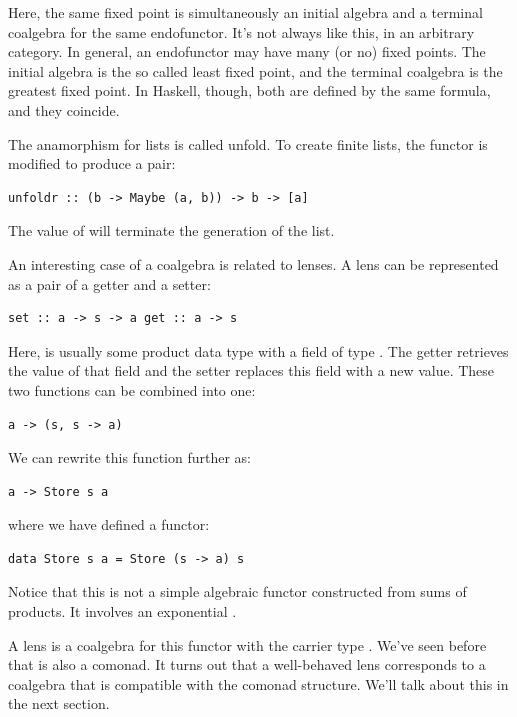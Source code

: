 Here, the same fixed point is simultaneously an initial algebra and a
terminal coalgebra for the same endofunctor. It's not always like this,
in an arbitrary category. In general, an endofunctor may have many (or
no) fixed points. The initial algebra is the so called least fixed
point, and the terminal coalgebra is the greatest fixed point. In
Haskell, though, both are defined by the same formula, and they
coincide.

The anamorphism for lists is called unfold. To create finite lists, the
functor is modified to produce a  pair:

\begin{verbatim}
unfoldr :: (b -> Maybe (a, b)) -> b -> [a]
\end{verbatim}

The value of  will terminate the generation of the list.

An interesting case of a coalgebra is related to lenses. A lens can be
represented as a pair of a getter and a setter:

\begin{verbatim}
set :: a -> s -> a get :: a -> s
\end{verbatim}

Here,  is usually some product data type with a field of type
. The getter retrieves the value of that field and the setter
replaces this field with a new value. These two functions can be
combined into one:

\begin{verbatim}
a -> (s, s -> a)
\end{verbatim}

We can rewrite this function further as:

\begin{verbatim}
a -> Store s a
\end{verbatim}

where we have defined a functor:

\begin{verbatim}
data Store s a = Store (s -> a) s
\end{verbatim}

Notice that this is not a simple algebraic functor constructed from sums
of products. It involves an exponential .

A lens is a coalgebra for this functor with the carrier type .
We've seen before that  is also a comonad. It turns out
that a well-behaved lens corresponds to a coalgebra that is compatible
with the comonad structure. We'll talk about this in the next section.

